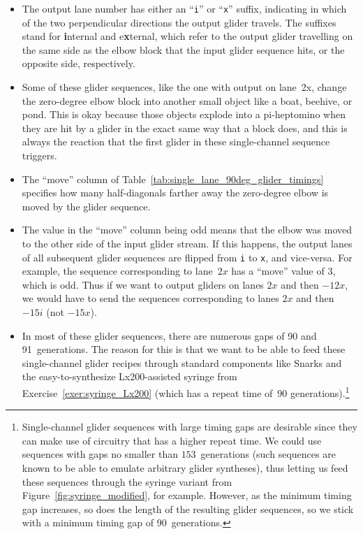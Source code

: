 \begin{itemize}
	\item The output lane number has either an ``\texttt{i}'' or ``\texttt{x}'' suffix, indicating in which of the two perpendicular directions the output glider travels. The suffixes stand for \textbf{i}nternal and e\textbf{x}ternal, which refer to the output glider travelling on the same side as the elbow block that the input glider sequence hits, or the opposite side, respectively.\smallskip 
	
	\item Some of these glider sequences, like the one with output on lane~2x, change the zero-degree elbow block into another small object like a boat, beehive, or pond. This is okay because those objects explode into a pi-heptomino when they are hit by a glider in the exact same way that a block does, and this is always the reaction that the first glider in these single-channel sequence triggers.\smallskip
	
	\item The ``move'' column of Table~\ref{tab:single_lane_90deg_glider_timings} specifies how many half-diagonals farther away the zero-degree elbow is moved by the glider sequence.\smallskip
	
	\item The value in the ``move'' column being odd means that the elbow was moved to the other side of the input glider stream. If this happens, the output lanes of all subsequent glider sequences are flipped from \texttt{i} to \texttt{x}, and vice-versa. For example, the sequence corresponding to lane~$2x$ has a ``move'' value of $3$, which is odd. Thus if we want to output gliders on lanes $2x$ and then $-12x$, we would have to send the sequences corresponding to lanes $2x$ and then $-15i$ (not $-15x$).\smallskip
	
	\item In most of these glider sequences, there are numerous gaps of 90 and 91~generations. The reason for this is that we want to be able to feed these single-channel glider recipes through standard components like Snarks and the easy-to-synthesize Lx200-assisted syringe from Exercise~\ref{exer:syringe_Lx200} (which has a repeat time of~$90$ generations).\footnote{Single-channel glider sequences with large timing gaps are desirable since they can make use of circuitry that has a higher repeat time. We could use sequences with gaps no smaller than $153$~generations (such sequences are known to be able to emulate arbitrary glider syntheses), thus letting us feed these sequences through the syringe variant from Figure~\ref{fig:syringe_modified}, for example. However, as the minimum timing gap increases, so does the length of the resulting glider sequences, so we stick with a minimum timing gap of 90~generations.}
	

\end{itemize}
